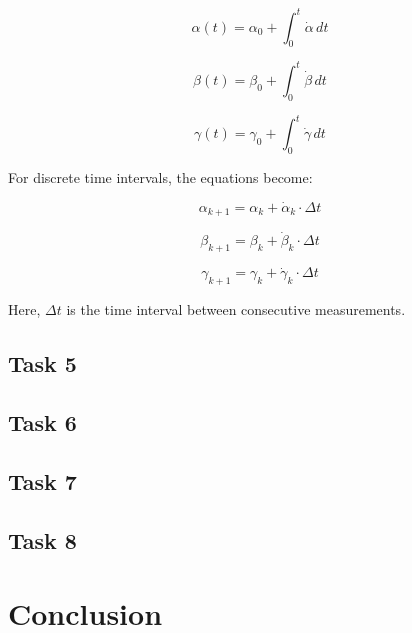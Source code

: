 \documentclass[12pt]{article}
\begin{document}
\begin{equation}
\label{eq:alpha_integral}
\alpha(t) = \alpha_0 + \int_0^t \dot{\alpha} \, dt
\end{equation}

\begin{equation}
\label{eq:beta_integral}
\beta(t) = \beta_0 + \int_0^t \dot{\beta} \, dt
\end{equation}

\begin{equation}
\label{eq:gamma_integral}
\gamma(t) = \gamma_0 + \int_0^t \dot{\gamma} \, dt
\end{equation}

For discrete time intervals, the equations become:

\begin{equation}
\label{eq:alpha_discrete}
\alpha_{k+1} = \alpha_k + \dot{\alpha}_k \cdot \Delta t
\end{equation}

\begin{equation}
\label{eq:beta_discrete}
\beta_{k+1} = \beta_k + \dot{\beta}_k \cdot \Delta t
\end{equation}

\begin{equation}
\label{eq:gamma_discrete}
\gamma_{k+1} = \gamma_k + \dot{\gamma}_k \cdot \Delta t
\end{equation}

Here, \( \Delta t \) is the time interval between consecutive measurements.

\subsection{Task 5}


\subsection{Task 6}


\subsection{Task 7}


\subsection{Task 8}

\section{Conclusion}






\appendix  
\clearpage
\addappheadtotoc 
\appendixpage 
\end{document}
